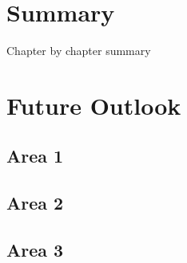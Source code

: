 \section{Summary}

Chapter by chapter summary

\section{Future Outlook}

\subsection{Area 1}

\subsection{Area 2}

\subsection{Area 3}

\clearpage
